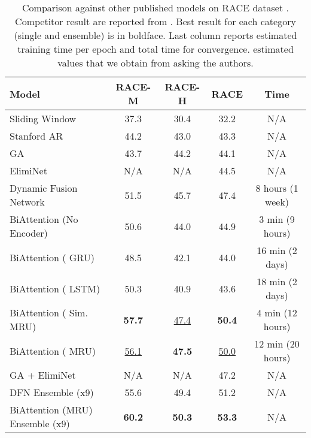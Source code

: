 \documentclass{article}
\begin{document}
\begin{table*}[t]
  \centering
 \small
    \begin{tabular}{|l|ccc|c|}
    \hline
        Model  & \multicolumn{1}{c}{RACE-M} & \multicolumn{1}{c}{RACE-H} & \multicolumn{1}{c|}{RACE} & \multicolumn{1}{c|}{Time} \\
          \hline
    Sliding Window \cite{lai2017race} & 37.3  & 30.4  & 32.2     & N/A  \\
    Stanford AR \cite{chen2016thorough} & 44.2  & 43.0    & 43.3         &  N/A\\
    GA  \cite{dhingra2016gated}  & 43.7  & 44.2  & 44.1         & N/A  \\
    ElimiNet \cite{sparikh2018eliminet} & N/A & N/A & 44.5 & N/A \\
    Dynamic Fusion Network \cite{xu2017towards}  & 51.5  & 45.7  & 47.4        & 8 hours (1 week) \\
    
    \hline
    BiAttention (No Encoder) & 50.6  & 44.0    & 44.9            & 3 min (9 hours)  \\
    BiAttention ( GRU) & 48.5& 42.1& 44.0 & 16 min (2 days)\\ 
    BiAttention ( LSTM) & 50.3 & 40.9 & 43.6  & 18 min (2 days)\\
    BiAttention ( Sim. MRU) & \textbf{57.7} & \underline{47.4}  & \textbf{50.4}  & 4 min (12 hours) \\
    BiAttention ( \textsc{MRU}) & \underline{56.1}  & \textbf{47.5}  &  \underline{50.0}  & 12 min (20 hours) \\
    \hline
    GA + ElimiNet \cite{sparikh2018eliminet} & N/A & N/A & 47.2  & N/A \\
    DFN Ensemble (x9) \cite{xu2017towards} & 55.6  &   49.4    & 51.2           &  N/A \\
    BiAttention (\textsc{MRU}) Ensemble (x9) & \textbf{60.2} & \textbf{50.3}       & \textbf{53.3}         &  N/A \\
    \hline
    \end{tabular}\caption{Comparison against other published models on RACE dataset \cite{lai2017race}. Competitor result are reported from \cite{lai2017race,xu2017towards}. Best result for each category (single and ensemble) is in boldface. Last column reports estimated training time per epoch and total time for convergence.  estimated values that we obtain from asking the authors. }
  \label{tab:race}\end{table*}
\end{document}

